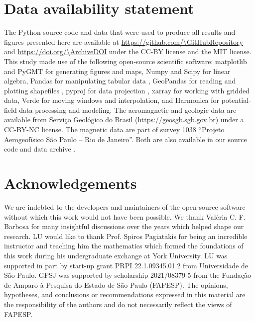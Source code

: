 \section*{Data availability statement}

The Python source code and data that were used to produce all results and
figures presented here are available at
\url{https://github.com/\GitHubRepository}
and \url{https://doi.org/\ArchiveDOI} \citep{figshare}
under the CC-BY license and the MIT license.
This study made use of the following open-source scientific software:
matplotlib \citep{matplotlib} and PyGMT \citep{pygmt} for generating figures
and maps,
Numpy \citep{numpy} and Scipy \citep{scipy} for linear algebra,
Pandas for manipulating tabular data \citep{McKinney2010,pandas},
GeoPandas for reading and plotting shapefiles \citep{geopandas},
pyproj for data projection \citep{pyproj},
xarray \citep{xarray} for working with gridded data,
Verde \citep{verde} for moving windows and interpolation,
and Harmonica \citep{harmonica} for potential-field data processing and
modeling.
The aeromagnetic and geologic data are available from Serviço Geológico do
Brasil (\url{https://geosgb.sgb.gov.br}) under a CC-BY-NC license.
The magnetic data are part of survey 1038 ``Projeto Aerogeofísico São Paulo --
Rio de Janeiro''.
Both are also available in our source code and data archive \citep{figshare}.


\section*{Acknowledgements}


We are indebted to the developers and maintainers of the open-source software
without which this work would not have been possible.
We thank Valéria C. F. Barbosa for many insightful discussions over the years
which helped shape our research.
LU would like to thank Prof. Spiros Pagiatakis for being an incredible
instructor and teaching him the mathematics which formed the foundations of
this work during his undergraduate exchange at York University.
LU was supported in part by start-up grant PRPI 22.1.09345.01.2 from
Universidade de São Paulo.
GFSJ was supported by scholarship 2021/08379-5 from the Fundação de Amparo
à Pesquisa do Estado de São Paulo (FAPESP).
The opinions, hypotheses, and conclusions or recommendations expressed in this
material are the responsibility of the authors and do not necessarily reflect
the views of FAPESP.

